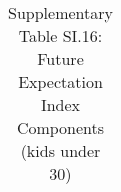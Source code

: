 \begin{longtable}{llcccccccccc}
\caption{Supplementary Table SI.16: Future Expectation Index Components (kids under 30)} \label{tab:pap__b4_3_1} \\                                                                                                                                                                                                                                                                                                                                                                                                                                                                                                                                                                                                                                                                                                                                                                       
\hline \hline                                                                                                                                                                                                                                                                                                                                                                                                                                                                                                                                                                                                                                                                                                                                                                                                                                                                             

\end{longtable}
